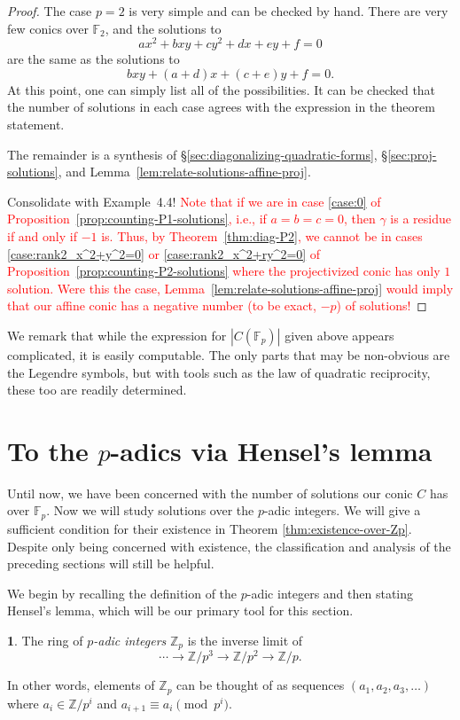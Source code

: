 \documentclass[10pt,a4paper]{amsart}
\numberwithin{equation}{section}
\numberwithin{figure}{section}
\theoremstyle{definition}
\theoremstyle{plain}
\theoremstyle{remark}
\theoremstyle{plain}
\theoremstyle{definition}
\newtheorem{defn}[thm]{\protect\definitionname}
\theoremstyle{plain}
\theoremstyle{plain}
\providecommand{\definitionname}{Definition}
\newcommand{\F}{\mathbb{F}}
\newcommand{\Z}{\mathbb{Z}}
\begin{document}
	\begin{proof} The case $p=2$ is very simple and can be checked by hand. There are very few conics over $\F_2$, and the solutions to 
		\[ ax^2 + bxy + cy^2 + dx + ey + f = 0 \] 
		are the same as the solutions to 
		\[ bxy + (a+d)x + (c+e)y + f = 0.  \] 
		At this point, one can simply list all of the
		possibilities. It can be checked that the number of solutions in each case agrees with the expression in the theorem statement.
		
		The remainder is a synthesis of \S\ref{sec:diagonalizing-quadratic-forms}, \S\ref{sec:proj-solutions}, and Lemma~\ref{lem:relate-solutions-affine-proj}.

        Consolidate with Example~4.4!
        \textcolor{red}{Note that if we are in case \eqref{case:0} of Proposition~\ref{prop:counting-P1-solutions}, i.e., if $a=b=c=0$, then $\gamma$ is a residue if and only if $-1$ is. Thus, by Theorem~\ref{thm:diag-P2}, we cannot be in cases \eqref{case:rank2_x^2+y^2=0} or \eqref{case:rank2_x^2+ry^2=0} of Proposition~\ref{prop:counting-P2-solutions} where the projectivized conic has only $1$ solution. Were this the case, Lemma~\ref{lem:relate-solutions-affine-proj} would imply that our affine conic has a negative number (to be exact, $-p$) of solutions!}
	\end{proof}

	We remark that while the expression for $|C(\F_p)|$ given above appears complicated, it is easily computable. The only parts that may be non-obvious are the Legendre symbols, but with tools such as the law of quadratic reciprocity, these too are readily determined.

    \section{To the $p$-adics via Hensel's lemma}\label{sec:hensels-lemma}
	Until now, we have been concerned with the number of solutions our conic $C$ has over $\F_p$. Now we will study solutions over the $p$-adic integers. We will give a sufficient condition for their existence in Theorem \ref{thm:existence-over-Zp}. Despite only being concerned with existence, the classification and analysis of the preceding sections will still be helpful.
	
	We begin by recalling the definition of the $p$-adic integers and then stating Hensel's lemma, which will be our primary tool for this section.
	\begin{defn}
		The ring of \emph{$p$-adic integers} $\Z_p$ is the inverse limit of
		\[
		\cdots \to \Z/p^3 \to \Z/p^2 \to \Z/p.
		\]
	\end{defn}
	In other words, elements of $\Z_p$ can be thought of as sequences $(a_1,a_2,a_3,\ldots)$ where $a_i \in \Z/p^i$ and $a_{i+1} \equiv a_i \pmod {p^i}$.
	
\end{document}
